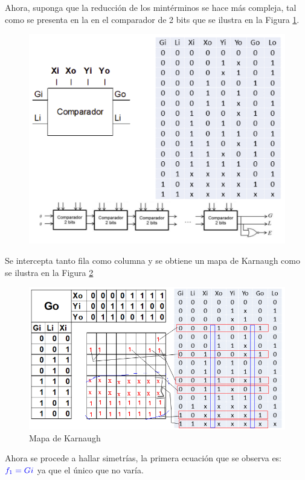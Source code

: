\documentclass[12pt,letterpaper]{book}
\begin{document}
\begin{multicols}{2}
Ahora, suponga que la reducción de los mintérminos se hace más compleja, tal como se presenta en la en el comparador de 2 bits que se ilustra en la Figura \ref{p5}.

\begin{figure}[H]
\centering
\includegraphics[width=1\linewidth]{figures/p5.png}
\caption{}
\label{p5}
\end{figure}
\vspace{0.2cm}

Se intercepta tanto fila como columna y se obtiene un mapa de Karnaugh como se ilustra en la Figura \ref{k1} 

\begin{figure}[H]
\centering
\includegraphics[width=1\linewidth]{figures/k1.png}
\caption{Mapa de Karnaugh}
\label{k1}
\end{figure}
\vspace{0.2cm}
Ahora se procede a hallar simetrías, la primera ecuación que se observa es: $\textcolor{blue}{f_1=Gi}$ ya que el único que no varía. 


\end{multicols}
\end{document}
